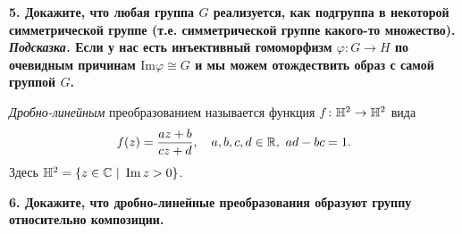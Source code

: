\documentclass[10pt]{article}
\begin{document}
\begin{landscape}
\begin{multicols}{2}
	\bf{5.} Докажите, что любая группа $G$ реализуется, как подгруппа в некоторой симметрической группе (т.е. симметрической группе какого-то множество). \emph{Подсказка.} Если у нас есть инъективный гомоморфизм $\varphi\colon G \to H$ по очевидным причинам $\mathrm{Im}{\varphi} \cong G$ и мы можем отождествить образ с самой группой $G$. 

	\begin{definition} 
		\emph{Дробно-линейным} преобразованием называется функция $f\colon \mathbb{H}^2 \to \mathbb{H}^2$ вида 
		\[
			f(z) = \frac{az + b}{cz + d}, \quad a, b, c, d \in \mathbb{R},\  ad - bc = 1.
		\]
		Здесь $\mathbb{H}^2 = \{ z \in \mathbb{C} \ \vert \ \mathop{\mathrm{Im}}\nolimits{z} > 0 \}$. 
	\end{definition}


	\bf{6.} Докажите, что дробно-линейные преобразования образуют группу относительно композиции.	
	
	\end{multicols}
	\end{landscape}
\end{document}
